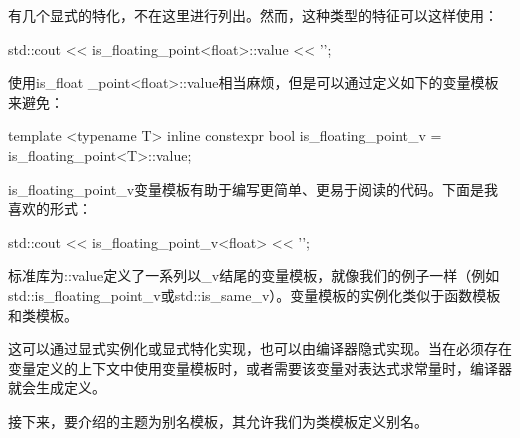 有几个显式的特化，不在这里进行列出。然而，这种类型的特征可以这样使用：

\begin{cppcode}
std::cout << is_floating_point<float>::value << '\n';
\end{cppcode}

使用is_float _point<float>::value相当麻烦，但是可以通过定义如下的变量模板来避免：

\begin{cppcode}
template <typename T>
inline constexpr bool is_floating_point_v =
	is_floating_point<T>::value;
\end{cppcode}

is_floating_point_v变量模板有助于编写更简单、更易于阅读的代码。下面是我喜欢的形式：

\begin{cppcode}
std::cout << is_floating_point_v<float> << '\n';
\end{cppcode}

标准库为::value定义了一系列以_v结尾的变量模板，就像我们的例子一样（例如std::is_floating_point_v或std::is_same_v）。变量模板的实例化类似于函数模板和类模板。

这可以通过显式实例化或显式特化实现，也可以由编译器隐式实现。当在必须存在变量定义的上下文中使用变量模板时，或者需要该变量对表达式求常量时，编译器就会生成定义。

接下来，要介绍的主题为别名模板，其允许我们为类模板定义别名。








